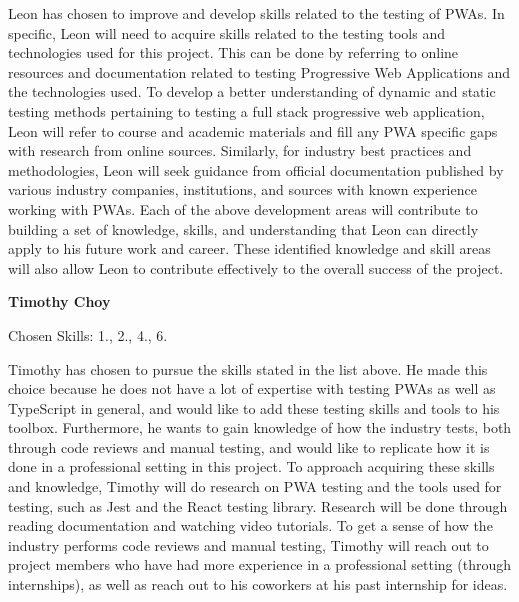 \documentclass[12pt, titlepage]{article}
\begin{document}
\begin{enumerate}
	      Leon has chosen to improve and develop skills related to the testing of PWAs. In specific, Leon
	      will need to acquire skills related to the testing tools and technologies used for this project.
	      This can be done by referring to online resources and documentation related to testing Progressive
	      Web Applications and the technologies used. To develop a better understanding of dynamic and static
	      testing methods pertaining to testing a full stack progressive web application, Leon will refer to
	      course and academic materials and fill any PWA specific gaps with research from online sources.
	      Similarly, for industry best practices and methodologies, Leon will seek guidance from official
	      documentation published by various industry companies, institutions, and sources with known
	      experience working with PWAs. Each of the above development areas will contribute to building a set
	      of knowledge, skills, and understanding that Leon can directly apply to his future work and career.
	      These identified knowledge and skill areas will also allow Leon to contribute effectively to the
	      overall success of the project.

	      \textbf{Timothy Choy}

	      Chosen Skills: 1., 2., 4., 6.

	      Timothy has chosen to pursue the skills stated in the list above. He made this choice because he
	      does not have a lot of expertise with testing PWAs as well as TypeScript in general, and would like
	      to add these testing skills and tools to his toolbox. Furthermore, he wants to gain knowledge of
	      how the industry tests, both through code reviews and manual testing, and would like to replicate
	      how it is done in a professional setting in this project. To approach acquiring these skills and
	      knowledge, Timothy will do research on PWA testing and the tools used for testing, such as Jest and
	      the React testing library. Research will be done through reading documentation and watching video
	      tutorials. To get a sense of how the industry performs code reviews and manual testing, Timothy
	      will reach out to project members who have had more experience in a professional setting (through
	      internships), as well as reach out to his coworkers at his past internship for ideas.

\end{enumerate}
\end{document}
